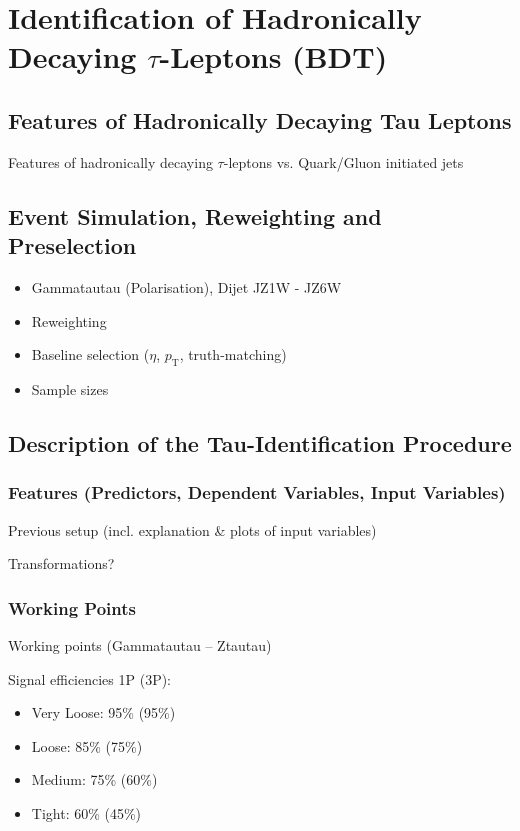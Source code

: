 \chapter{Identification of Hadronically Decaying $\tau$-Leptons (BDT)}
\label{sec:bdt}

\section{Features of Hadronically Decaying Tau Leptons}
\label{sec:features_tau_decay}

Features of hadronically decaying $\tau$-leptons vs. Quark/Gluon initiated jets


\section{Event Simulation, Reweighting and Preselection}
\label{sec:bdt_eventsim}

\begin{itemize}
\item Gammatautau (Polarisation), Dijet JZ1W - JZ6W
\item Reweighting
\item Baseline selection ($\eta$, $p_\mathrm{T}$, truth-matching)
\item Sample sizes
\end{itemize}


\section{Description of the Tau-Identification Procedure}
\label{sec:bdt_tauid}

\subsection{Features (Predictors, Dependent Variables, Input Variables)}
\label{sec:bdt_features}

Previous setup (incl. explanation \& plots of input variables)

Transformations?

\subsection{Working Points}
\label{sec:bdt_working_points}

Working points (Gammatautau -- Ztautau)

Signal efficiencies 1P (3P):
\begin{itemize}
\item Very Loose: 95\% (95\%)
\item Loose: 85\% (75\%)
\item Medium: 75\% (60\%)
\item Tight: 60\% (45\%)
\end{itemize}


